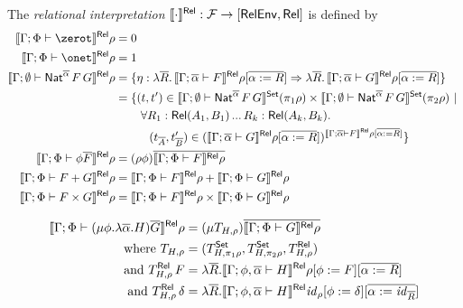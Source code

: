 \documentclass{lmcs}
\theoremstyle{plain}\newtheorem{satz}[thm]{Satz}
\newcommand{\F}{\mathcal{F}}
\newcommand{\set}{\mathsf{Set}}
\renewcommand{\id}{\mathit{id}}
\begin{document}
{\begin{defi}\label{def:rel-sem}
The {\em relational interpretation} $\relsem{\cdot} : \F \to [\relenv,
 \rel]$ is defined by
\begin{align*}
  \relsem{\Gamma;\Phi \vdash \zerot}\rho &= 0\\
  \relsem{\Gamma;\Phi \vdash \onet}\rho &= 1\\
  \relsem{\Gamma; \emptyset \vdash \Nat^{\ol{\alpha}} \,F\,G}\rho &= \{\eta
  : \lambda \ol{R}.\,\relsem{\Gamma; \ol{\alpha} \vdash
    F}\rho[\ol{\alpha := R}] \Rightarrow \lambda \ol{R}. \,\relsem{
    \Gamma; \ol{\alpha} \vdash G}\rho[\ol{\alpha := R}]\}\\
  &=
  \{(t,t') \in \setsem{\Gamma; \emptyset
    \vdash \Nat^{\ol{\alpha}}
    \,F\,G} (\pi_1 \rho) \times \setsem{ 
    \Gamma;\emptyset
    \vdash \Nat^{\ol{\alpha}} \,F\,G} (\pi_2
  \rho)~|~\\ 
  & \hspace{0.3in} \forall {R_1 : \rel(A_1,B_1)}\,...\,{R_k : \rel(A_k,B_k)}.\\
  & \hspace{0.4in} (t_{\ol{A}},t'_{\ol{B}}) \in
  (\relsem{\Gamma; \ol{\alpha} \vdash G}\rho[\ol{\alpha :=
      R}])^{\relsem{\Gamma;\ol{\alpha}\vdash F}\rho[\ol{\alpha := R}]} \}\\  
  \relsem{\Gamma;\Phi \vdash \phi \ol{F}}\rho &=
  (\rho\phi)\ol{\relsem{\Gamma;\Phi \vdash 
    F}\rho}\\
  \relsem{\Gamma;\Phi \vdash F+G}\rho &=
  \relsem{\Gamma;\Phi \vdash F}\rho +
  \relsem{\Gamma;\Phi \vdash G}\rho\\
  \relsem{\Gamma;\Phi \vdash F\times G}\rho &=
  \relsem{\Gamma;\Phi \vdash F}\rho \times
  \relsem{\Gamma;\Phi \vdash G}\rho\\  
\end{align*}

\vspace*{-0.5in}

\begin{align*}
   \relsem{\Gamma;\Phi \vdash (\mu \phi.\lambda
    \ol{\alpha}. H)\ol{G}}\rho
  &= (\mu T_{H,\rho})\ol{\relsem{\Gamma;\Phi \vdash G}\rho}\\
  \text{where }	T_{H,\rho}
    &= (T^\set_{H,\pi_1\rho}, T^\set_{H,\pi_2\rho}, T^\rel_{H,\rho}) \\
  \text{and } T^\rel_{H,\rho}\,F
    &= \lambda \ol{R}. \relsem{
      \Gamma;\phi,\ol{\alpha} \vdash H}\rho[\phi :=
    F][\ol{\alpha := R}]\\
  \text{and } T^\rel_{H,\rho}\,\delta
    &= \lambda \ol{R}. \relsem{
      \Gamma;\phi,\ol{\alpha} \vdash H}\id_\rho[\phi :=
    \delta][\ol{\alpha := \id_{\ol{R}}}]
\end{align*}
\end{defi}

}
\end{document}
